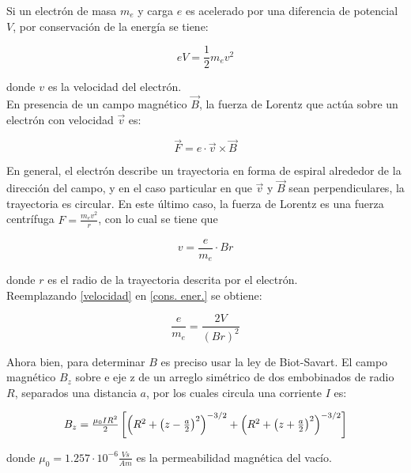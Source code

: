 \documentclass[prb,aps,twocolumn,preprintnumbers,amsmath,amssymb]{revtex4}
\newcommand*{\Scale}[2][4]{\scalebox{#1}{$#2$}}%
\begin{document}
Si un electrón de masa $m_{e}$ y carga $e$ es acelerado por una diferencia de potencial $V$, por conservación de la energía se tiene:

\begin{equation}
\label{cons. ener.}
eV = \frac{1}{2} m_{e} v^2
\end{equation}

\noindent
donde $v$ es la velocidad del electrón.\\

En presencia de un campo magnético $\vec{B}$, la fuerza de Lorentz que actúa sobre un electrón con velocidad $\vec{v}$ es: 

\begin{equation}
\vec{F} = e\cdot\vec{v}\times\vec{B}
\end{equation}

En general, el electrón describe un trayectoria en forma de espiral alrededor de la dirección del campo, y en el caso particular en que $\vec{v}$ y $\vec{B}$ sean perpendiculares, la trayectoria es circular. En este último caso, la fuerza de Lorentz es una fuerza centrífuga $F = \frac{m_{e}v^2}{r}$, con lo cual se tiene que 

\begin{equation}
\label{velocidad}
v = \frac{e}{m_{e}} \cdot Br
\end{equation}

\noindent
donde $r$ es el radio de la trayectoria descrita por el electrón.\\
\indent
Reemplazando \eqref{velocidad} en \eqref{cons. ener.} se obtiene:

\begin{equation}
\label{carga-masa}
\frac{e}{m_{e}} = \frac{2V}{(Br)^2}
\end{equation}

Ahora bien, para determinar $B$ es preciso usar la ley de Biot-Savart. El campo magnético $B_{z}$ sobre e eje z de un arreglo simétrico de dos embobinados de radio $R$, separados una distancia $a$, por los cuales circula una corriente $I$ es:

\begin{equation*}
\Scale[0.98]{
B_{z} = \frac{\mu_{0}IR^2}{2}\left[ \left( R^2 + \left(z - \frac{a}{2}\right)^2 \right)^{-3/2} + \left( R^2 + \left(z + \frac{a}{2}\right)^2 \right)^{-3/2} \right]
}
\end{equation*}

\noindent
donde $\mu_{0} = 1.257\cdot10^{-6} \frac{Vs}{Am}$ es la permeabilidad magnética del vacío.\\
\end{document}

